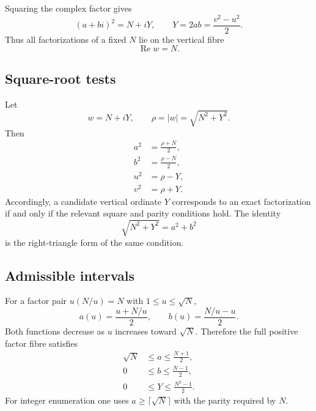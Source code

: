 \documentclass[11pt]{article}
\theoremstyle{definition}
\theoremstyle{remark}
\newcommand{\1}{\mathbf{1}}
\newcommand{\Repart}{\operatorname{Re}}
\begin{document}
Squaring the complex factor gives
\begin{equation}
 (a+bi)^2=N+iY,
 \qquad
 \boxed{Y=2ab=\frac{v^2-u^2}{2}.}
 \label{eq:full-square}
\end{equation}
Thus all factorizations of a fixed $N$ lie on the vertical fibre
\begin{equation}
 \Repart w=N.
 \label{eq:vertical-fibre}
\end{equation}

\subsection{Square-root tests}

Let
\begin{equation}
 w=N+iY,
 \qquad
 \rho=|w|=\sqrt{N^2+Y^2}.
 \label{eq:rho-full}
\end{equation}
Then
\begin{align}
 a^2&=\frac{\rho+N}{2},
 \label{eq:a-square}\\
 b^2&=\frac{\rho-N}{2},
 \label{eq:b-square}\\
 u^2&=\rho-Y,
 \label{eq:u-square}\\
 v^2&=\rho+Y.
 \label{eq:v-square}
\end{align}
Accordingly, a candidate vertical ordinate $Y$ corresponds to an exact factorization if and only if the relevant square and parity conditions hold.  The identity
\begin{equation}
 \sqrt{N^2+Y^2}=a^2+b^2
 \label{eq:hypotenuse}
\end{equation}
is the right-triangle form of the same condition.

\subsection{Admissible intervals}

For a factor pair $u(N/u)=N$ with $1\le u\le\sqrt N$,
\begin{equation}
 a(u)=\frac{u+N/u}{2},
 \qquad
 b(u)=\frac{N/u-u}{2}.
 \label{eq:ab-u}
\end{equation}
Both functions decrease as $u$ increases toward $\sqrt N$.  Therefore the full positive factor fibre satisfies
\begin{align}
 \sqrt N&\le a\le\frac{N+1}{2},
 \label{eq:a-full-range}\\
 0&\le b\le\frac{N-1}{2},
 \label{eq:b-full-range}\\
 0&\le Y\le\frac{N^2-1}{2}.
 \label{eq:Y-full-range}
\end{align}
For integer enumeration one uses $a\ge\lceil\sqrt N\rceil$ with the parity required by $N$.
\end{document}
